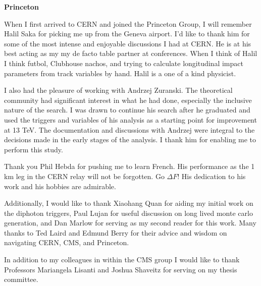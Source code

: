 \begin{center} \textbf{Princeton} \end{center}

When I first arrived to CERN and joined the Princeton Group, I will remember Halil Saka for picking me up from the Geneva airport. 
I'd like to thank him for some of the most intense and enjoyable discussions I had
at CERN. He is at his best acting as my
my de facto table partner at conferences. When I think of Halil I think 
futbol, Clubhouse nachos, and trying to calculate longitudinal impact parameters from track variables by hand. Halil is a one of a kind physicist. 

I also had the pleasure of working with Andrzej Zuranski.
The theoretical community had significant interest in what
he had done, especially the inclusive nature of the search. I was drawn to continue his search after he graduated and used
the triggers and variables of his analysis as a starting point for improvement at 13 TeV.
The documentation and discussions with Andrzej were integral to the decisions made in the
early stages of the analysis. I thank him for enabling me to perform this study. 

Thank you Phil Hebda for pushing me to learn French. His performance as the 1 km leg in the
 CERN relay will not be forgotten. Go $\Delta F$! 
His dedication to his work and his hobbies are admirable. 

Additionally, I would like to thank Xiaohang Quan for aiding my initial work on the diphoton triggers,
Paul Lujan for useful discussion on long lived monte carlo generation, and Dan Marlow for serving as my second
reader for this work. Many thanks to Ted Laird and Edmund Berry for their advice and wisdom on navigating CERN, CMS, 
and Princeton.

In addition to my colleagues in within the CMS group I would like to thank Professors Mariangela Lisanti and Joshua Shaveitz for serving
on my thesis committee.

